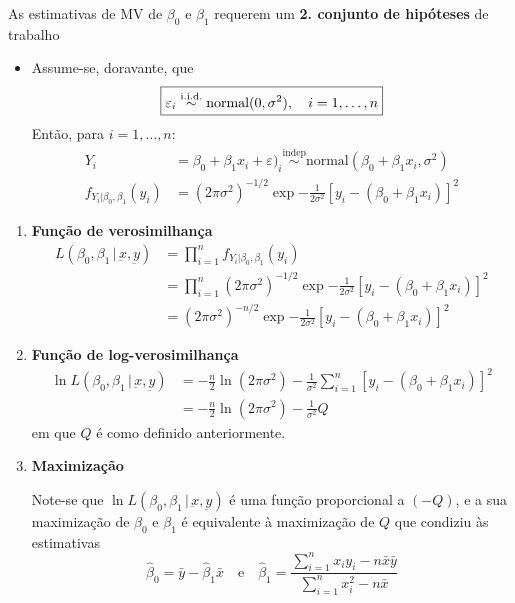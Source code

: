 As estimativas de MV de $\beta_0$ e $\beta_1$ requerem um \textbf{2\textordmasculine{}. conjunto de hipóteses} de trabalho
\begin{itemize}
    \item Assume-se, doravante, que 
    $$\boxed{%
        \varepsilon_i \overset{\text{i.i.d.}}{\sim} \text{normal}(0, \sigma^2), \quad i = 1,\dots,n
    }$$
    \noindent Então, para $i = 1,\dots,n$:
    $$
        \begin{aligned}
            Y_i &= \beta_0 + \beta_1 x_i + \varepsilon)_i \overset{\text{indep}}{\sim} \text{normal}(\beta_0 + \beta_1 x_i, \sigma^2)\\
            f_{Y_i | \beta_0,\beta_1}(y_i) &= (2\pi \sigma^2)^{-1/2} \exp{-\frac{1}{2\sigma^2}[y_i - (\beta_0 + \beta_1 x_i)]^2}
        \end{aligned}
    $$
\end{itemize}

\vspace{-0.75em}
\begin{mdframed}
    \begin{enumerate}[leftmargin=*, label=\textbf{\arabic*.}]
        \item \textbf{Função de verosimilhança}
        $$
            \begin{aligned}
                L(\beta_0, \beta_1 \,|\, \underbar{x},\underbar{y}) &= \prod^{n}_{i=1} f_{Y_i | \beta_0,\beta_1}(y_i) \\
                &= \prod^{n}_{i=1} (2\pi \sigma^2)^{-1/2} \exp{-\frac{1}{2\sigma^2}[y_i - (\beta_0 + \beta_1 x_i)]^2}\\
                &= (2\pi \sigma^2)^{-n/2} \exp{-\frac{1}{2\sigma^2}[y_i - (\beta_0 + \beta_1 x_i)]^2}
            \end{aligned}
        $$

        \item \textbf{Função de log-verosimilhança}
        $$
            \begin{aligned}
                \ln L(\beta_0, \beta_1 \,|\, \underbar{x},\underbar{y}) &= -\frac{n}{2}\ln(2\pi \sigma^2) - \frac{1}{\sigma^2} \sum^{n}_{i=1} [y_i - (\beta_0 + \beta_1 x_i)]^2 \\
                &= -\frac{n}{2}\ln(2\pi \sigma^2) - \frac{1}{\sigma^2} Q
            \end{aligned}
        $$
        em que $Q$ é como definido anteriormente.

        \item \textbf{Maximização}

        Note-se que $\ln L(\beta_0, \beta_1 \,|\, \underbar{x},\underbar{y})$ é uma função proporcional a $(-Q)$, e a sua maximização de $\beta_0$ e $\beta_1$ é equivalente à maximização de $Q$ que condiziu às estimativas
        $$
            \hat{\beta}_0 = \bar{y} - \hat{\beta}_1 \bar{x} \quad \text{e} \quad
            \hat{\beta}_1 = \frac{\sum^{n}_{i=1} x_i y_i - n \bar{x} \bar{y}}{\sum^{n}_{i=1} x^2_i - n \bar{x}}
        $$
    \end{enumerate}
\end{mdframed}

